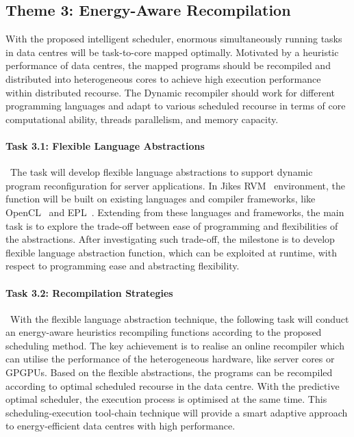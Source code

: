 \subsection{Theme 3: Energy-Aware Recompilation}
With the proposed intelligent scheduler, enormous simultaneously running tasks in data centres will be task-to-core mapped optimally. Motivated by a heuristic performance of data centres, the mapped programs should be recompiled and distributed into heterogeneous cores to achieve high execution performance within distributed recourse. The Dynamic recompiler should work for different programming languages and adapt to various scheduled recourse in terms of core computational ability, threads parallelism, and memory capacity. 

\paragraph{Task 3.1: Flexible Language Abstractions}~The task will develop flexible language abstractions to support dynamic program reconfiguration for server applications. In Jikes RVM~\cite{JRVM} environment, the function will be built on existing languages and compiler frameworks, like OpenCL~\cite{opencl} and EPL~\cite{epl}. Extending from these languages and frameworks, the main task is to explore the trade-off between ease of programming and flexibilities of the abstractions. After investigating such trade-off, the milestone is to develop flexible language abstraction function, which can be exploited at runtime, with respect to programming ease and abstracting flexibility.

\paragraph{Task 3.2: Recompilation Strategies}~With the flexible language abstraction technique, the following task will conduct an energy-aware heuristics recompiling functions according to the proposed scheduling method. The key achievement is to realise an online recompiler which can utilise the performance of the heterogeneous hardware, like server cores or GPGPUs. Based on the flexible abstractions, the programs can be recompiled according to optimal scheduled recourse in the data centre. With the predictive optimal scheduler, the execution process is optimised at the same time. This scheduling-execution tool-chain technique will provide a smart adaptive approach to energy-efficient data centres with high performance.

